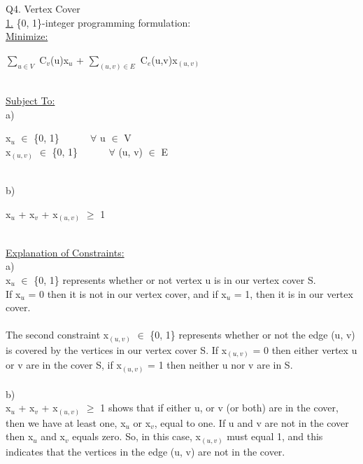 \documentclass[10pt]{csc_assignment}
\begin{document}
\begin{description}
\begin{flushleft}
\newpage
\item[Q4. Vertex Cover]
~\\
\underline{1.} \{0, 1\}-integer programming formulation:\\
\underline{Minimize:}\\
\hspace*{1cm}\parbox{15cm}{
$\sum_{u \in V}$ C$_{v}$(u)x$_{u}$ + $\sum_{(u, v) \in E}$ C$_{e}$(u,v)x$_{(u, v)}$
}\\
\underline{Subject To:}\\
a) \\
\hspace*{1cm}\parbox{15cm}{
x$_{u}$ $\in$ \{0, 1\} ~~~~~ $\forall$ u $\in$ V\\ 
x$_{(u, v)}$ $\in$ \{0, 1\} ~~~~~ $\forall$ (u, v) $\in$ E\\ 
}\\
b)\\
\hspace*{1cm}\parbox{15cm}{
x$_{u}$ + x$_{v}$ + x$_{(u, v)}$ $\geqslant$ 1\\
}\\
\underline{Explanation of Constraints:}\\

a)\\
 x$_{u}$ $\in$ \{0, 1\} represents whether or not vertex u is  in our vertex cover S.\\
 If x$_{u}$ = 0 then it is not in our vertex cover, and if x$_{u}$ = 1, then it is in our vertex cover.\\
~\\
The second constraint x$_{(u, v)}$ $\in$ \{0, 1\} represents whether or not the edge (u, v) is covered by the vertices in our vertex cover S. If x$_{(u, v)}$ = 0 then either vertex u or v are in the cover S, if x$_{(u, v)}$ = 1 then neither u nor v are in S.\\
~\\
b)\\
 x$_{u}$ + x$_{v}$ + x$_{(u, v)}$ $\geqslant$ 1 shows that if either u, or v (or both) are in the cover, then we have at least one,  x$_{u}$ or  x$_{v}$, equal to one. If u and v are not in the cover then  x$_{u}$ and  x$_{v}$ equals zero. So, in this case, x$_{(u, v)}$ must equal 1, and this indicates that the vertices in the edge (u, v) are not in the cover.\\
~\\


\end{flushleft}
\end{description}
\end{document}
